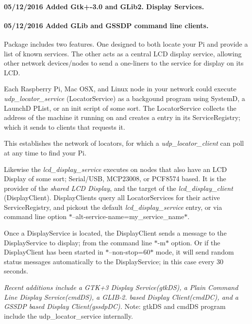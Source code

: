 \paragraph*{05/12/2016 Added Gtk+-\/3.0 and G\+Lib2. Display Services.}

  

\paragraph*{05/12/2016 Added G\+Lib and G\+S\+S\+DP command line clients.}



Package includes two features. One designed to both locate your Pi and provide a list of known services. The other acts as a central L\+CD display service, allowing other network devices/nodes to send a one-\/liners to the service for display on its L\+CD.

Each Raspberry Pi, Mac O\+SX, and Linux node in your network could execute {\itshape udp\+\_\+locator\+\_\+service} (Locator\+Service) as a backgound program using SystemD, a LaunchD P\+List, or an init script of some sort. The Locator\+Service collects the address of the machine it running on and creates a entry in its Service\+Registry; which it sends to clients that requests it.

This establishes the network of locators, for which a {\itshape udp\+\_\+locator\+\_\+client} can poll at any time to find your Pi.

Likewise the {\itshape lcd\+\_\+display\+\_\+service} executes on nodes that also have an L\+CD Display of some sort; Serial/\+U\+SB, M\+C\+P23008, or P\+C\+F8574 based. It is the provider of the {\itshape shared L\+CD Display}, and the target of the {\itshape lcd\+\_\+display\+\_\+client} (Display\+Client). Display\+Clients query all Locator\+Services for their active Service\+Registry, and pickout the default {\itshape lcd\+\_\+display\+\_\+service} entry, or via command line option $\ast$--alt-\/service-\/name=my\+\_\+service\+\_\+name$\ast$.

Once a Display\+Service is located, the Display\+Client sends a message to the Display\+Service to display; from the command line $\ast$-\/m$\ast$ option. Or if the Display\+Client has been started in $\ast$--non-\/stop=60$\ast$ mode, it will send random status messages automatically to the Display\+Service; in this case every 30 seconds.

{\itshape Recent additions include a G\+T\+K+3 Display Service(gtk\+D\+S), a Plain Command Line Display Service(cmd\+D\+S), a G\+L\+I\+B-\/2. based Display Client(cmd\+D\+C), and a G\+S\+S\+DP based Display Client(gssdp\+D\+C).} Note\+: gtk\+DS and cmd\+DS program include the udp\+\_\+locator\+\_\+service internally.

